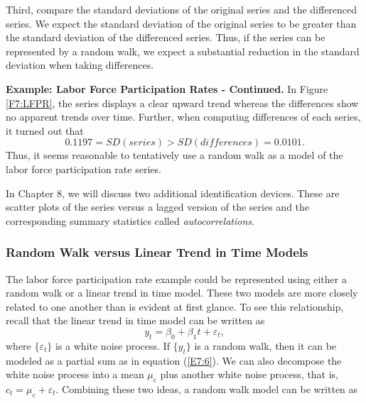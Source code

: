 Third, compare the standard deviations of the original series and
the differenced series. We expect the standard deviation of the
original series to be greater than the standard deviation of the
differenced series. Thus, if the series can be represented by a
random walk, we expect a substantial reduction in the standard
deviation when taking differences.

\linejed


\textbf{Example: Labor Force Participation Rates - Continued.} In
Figure \ref{F7:LFPR}, the series displays a clear upward trend
whereas the differences show no apparent trends over time. Further,
when computing differences of each series, it turned out
that%
\begin{equation*}
0.1197=SD(series)>SD(differences)=0.0101.
\end{equation*}
Thus, it seems reasonable to tentatively use a random walk as a
model of the labor force participation rate series.

In Chapter 8, we will discuss two additional identification devices.
These are scatter plots of the series versus a lagged version of the
series and the corresponding summary statistics called
\emph{autocorrelations}.

 \linejed
\subsubsection*{Random Walk versus Linear Trend in Time Models}

The labor force participation rate example could be represented
using either a random walk or a linear trend in time model. These
two models are more closely related to one another than is evident
at first glance. To see this relationship, recall that the linear
trend in time model can be written as
\begin{equation}\label{E7:7}
y_t = \beta_0 + \beta_1 t + \varepsilon_t,
\end{equation}
where $\{\varepsilon_t\}$ is a white noise process. If $\{y_t\}$ is
a random walk, then it can be modeled as a partial sum as in
equation (\ref{E7:6}). We can also decompose the white noise process
into a mean $\mu _c$ plus another white noise process, that is, $c_t
= \mu_c + \varepsilon_t$. Combining these two ideas, a random walk
model can be written as

